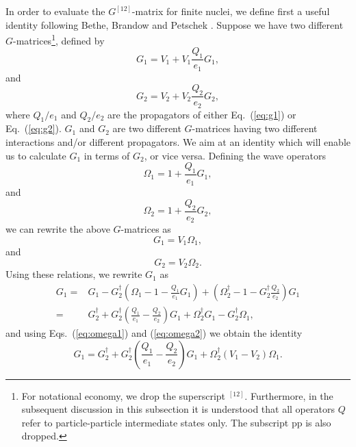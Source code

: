 \documentclass{article}
\begin{document}
In order to evaluate the $G^{[12]}$-matrix for finite nuclei,
we define first a useful identity following Bethe, Brandow and
Petschek \cite{bbp63}. Suppose we have two
different $G$-matrices\footnote{For notational economy,
we drop the superscript $^{[12]}$. Furthermore,
in the subsequent discussion in
this subsection it is understood that all operators $Q$
refer to particle-particle intermediate states only. The subscript
$\mathrm{pp}$ is also dropped.}, defined by
\begin{equation}
    G_1=V_1+V_1\frac{Q_1}{e_1}G_1,
\end{equation}
and
\begin{equation}
    G_2=V_2+V_2\frac{Q_2}{e_2}G_2,
\end{equation}
where $Q_1/e_1$ and $Q_2/e_2$ are the propagators of
either Eq.\ (\ref{eq:g1}) or Eq.\ (\ref{eq:g2}). $G_1$ and $G_2$
are two different $G$-matrices having two different interactions
and/or different propagators. We aim at an identity
which will enable us to calculate $G_1$ in terms of $G_2$,
or vice versa.
Defining the wave operators
\begin{equation}
    \Omega_1=1+\frac{Q_1}{e_1}G_1,
\end{equation}
and
\begin{equation}
    \Omega_2=1+\frac{Q_2}{e_2}G_2,
\end{equation}
we can rewrite the above $G$-matrices as
\begin{equation}
    G_1=V_1\Omega_1,
    \label{eq:omega1}
\end{equation}
and
\begin{equation}
    G_2=V_2\Omega_2.
    \label{eq:omega2}
\end{equation}
Using these relations, we rewrite $G_1$ as
\begin{eqnarray}
   G_1=&G_1 -{\displaystyle
         G_2^{\dagger}\left(\Omega_1-1-\frac{Q_1}{e_1}G_1\right)
        +\left(\Omega_2^{\dagger}-1-G_2^{\dagger}\frac{Q_2}{e_2}\right)G_1}
         \nonumber \\
       =&{\displaystyle G_2^{\dagger} +G_2^{\dagger}\left(\frac{Q_1}{e_1}-
        \frac{Q_2}{e_2}\right)G_1
        +\Omega_2^{\dagger}G_1 -G_2^{\dagger}\Omega_1},
\end{eqnarray}
and using Eqs.\ (\ref{eq:omega1}) and (\ref{eq:omega2}) we obtain
the identity
\begin{equation}
        G_1=G_2^{\dagger} +G_2^{\dagger}
        \left(\frac{Q_1}{e_1}-\frac{Q_2}{e_2}\right)G_1
        +\Omega_2^{\dagger}(V_1-V_2)\Omega_1.
        \label{eq:gidentity}
\end{equation}
\end{document}
